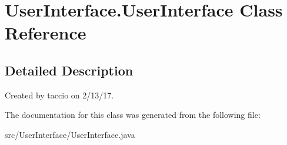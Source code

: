 \hypertarget{classUserInterface_1_1UserInterface}{\section{User\-Interface.\-User\-Interface Class Reference}
\label{classUserInterface_1_1UserInterface}
}


\subsection{Detailed Description}
Created by taccio on 2/13/17. 

The documentation for this class was generated from the following file\-:\begin{DoxyCompactItemize}
\item 
src/\-User\-Interface/User\-Interface.\-java\end{DoxyCompactItemize}

